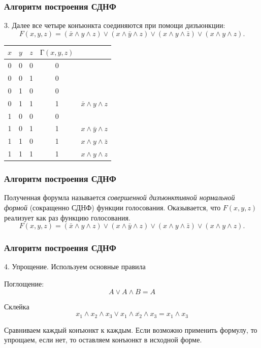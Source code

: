 \begin{frame}
\frametitle{Алгоритм построения СДНФ}

3. Далее все четыре конъюнкта соединяются при помощи
дизъюнкции:
$$
F(x,y,z) = (\bar x\wedge y\wedge z)\vee(x \wedge \bar y \wedge z)\vee(x \wedge y \wedge \bar z)\vee(x \wedge y \wedge z).
$$

\begin{tabular}{|c|c|c||c|l}
  \hline
  $x$  & $y$ & $z$ & $Г(x,y,z)$ & \\
  \hline
   0   & 0 & 0 &  0 &  \\
   0   & 0 & 1 &  0 &  \\
   0   & 1 & 0 &  0 &  \\
   0   & 1 & 1 &  1 & $\bar{x}\wedge y \wedge z $ \\
   1   & 0 & 0 &  0 &  \\
   1   & 0 & 1 &  1 & $x\wedge \bar{y} \wedge z$ \\
   1   & 1 & 0 &  1 & $x\wedge y \wedge \bar{z}$\\
   1   & 1 & 1 &  1 & $x\wedge y \wedge z$\\
  \hline
\end{tabular}

\end{frame}

\begin{frame}
\frametitle{Алгоритм построения СДНФ}

Полученная форумла называется \textit{совершенной дизъюнктивной нормальной формой} (сокращенно СДНФ) функции голосования.
Оказывается, что $F(x,y,z)$ реализует как раз функцию голосования.
$$
F(x,y,z) = (\bar x\wedge y\wedge z)\vee(x \wedge \bar y \wedge z)\vee(x \wedge y \wedge \bar z)\vee(x \wedge y \wedge z).
$$

\end{frame}

\begin{frame}
\frametitle{Алгоритм построения СДНФ}

4. Упрощение. Используем основные правила

Поглощение:
$$ A \vee A\wedge B =A$$ \pause

Склейка
$$ x_1\wedge x_2 \wedge x_3 \vee x_1\wedge \overline{x_2} \wedge x_3 = x_1 \wedge x_3$$

Сравниваем каждый конъюнкт к каждым. Если возможно применить формулу, то упрощаем, если нет, то оставляем конъюнкт в исходной форме.

\end{frame}

